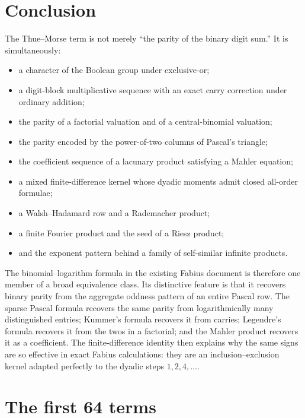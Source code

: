 \documentclass[11pt,oneside]{article}
\theoremstyle{definition}
\theoremstyle{remark}
\begin{document}
\section{Conclusion}
\label{sec:conclusion}

The Thue--Morse term is not merely ``the parity of the binary digit sum.''  It
is simultaneously:
\begin{itemize}
\item a character of the Boolean group under exclusive-or;
\item a digit-block multiplicative sequence with an exact carry correction
      under ordinary addition;
\item the parity of a factorial valuation and of a central-binomial valuation;
\item the parity encoded by the power-of-two columns of Pascal's triangle;
\item the coefficient sequence of a lacunary product satisfying a Mahler
      equation;
\item a mixed finite-difference kernel whose dyadic moments admit closed
      all-order formulae;
\item a Walsh--Hadamard row and a Rademacher product;
\item a finite Fourier product and the seed of a Riesz product;
\item and the exponent pattern behind a family of self-similar infinite
      products.
\end{itemize}

The binomial--logarithm formula in the existing Fabius document is therefore
one member of a broad equivalence class.  Its distinctive feature is that it
recovers binary parity from the aggregate oddness pattern of an entire Pascal
row.  The sparse Pascal formula recovers the same parity from logarithmically
many distinguished entries; Kummer's formula recovers it from carries;
Legendre's formula recovers it from the twos in a factorial; and the Mahler
product recovers it as a coefficient.  The finite-difference identity then
explains why the same signs are so effective in exact Fabius calculations:
they are an inclusion--exclusion kernel adapted perfectly to the dyadic
steps \(1,2,4,\ldots\).

\appendix

\section{The first 64 terms}
\label{app:first-terms}
\end{document}
